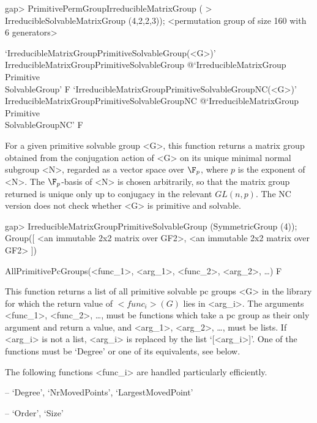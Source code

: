 \beginexample
gap> PrimitivePermGroupIrreducibleMatrixGroup (
>       IrreducibleSolvableMatrixGroup (4,2,2,3));
<permutation group of size 160 with 6 generators>
\endexample

\>`IrreducibleMatrixGroupPrimitiveSolvableGroup(<G>)'%
{IrreducibleMatrixGroupPrimitiveSolvableGroup}%
@{`IrreducibleMatrixGroup\\Primitive\\SolvableGroup'} F
\>`IrreducibleMatrixGroupPrimitiveSolvableGroupNC(<G>)'%
{IrreducibleMatrixGroupPrimitiveSolvableGroupNC}%
@{`IrreducibleMatrixGroup\\Primitive\\SolvableGroupNC'} F

For a given primitive solvable group <G>, this function returns a matrix group 
obtained from the conjugation
action of <G> on its unique minimal normal subgroup <N>, regarded as a vector 
space over $\F_p$, where $p$ is the exponent of <N>. 
The $\F_p$-basis of <N> is chosen arbitrarily, so that the matrix group returned 
is unique only up to conjugacy in the relevant $GL(n, p)$. The NC version does
not check whether <G> is primitive and solvable.

\beginexample
gap> IrreducibleMatrixGroupPrimitiveSolvableGroup (SymmetricGroup (4));
Group([ <an immutable 2x2 matrix over GF2>, 
  <an immutable 2x2 matrix over GF2> ])
\endexample


\>AllPrimitivePcGroups(<func_1>, <arg_1>, <func_2>, <arg_2>, \dots) F

This function returns a list of all primitive solvable pc
groups <G> in the  {\IRREDSOL} library for which the return value of $<func_i>(G)$ lies
in <arg_i>.  The arguments <func_1>, <func_2>, \dots,
must be {\GAP} functions which take a pc group as their only argument and return a
value, and <arg_1>, <arg_2>,
\dots,  must be lists. If <arg_i> is not a list, <arg_i> is replaced by the list
`[<arg_i>]'. One of the functions must be `Degree' or one of its
equivalents, see below.

The following functions <func_i> are handled particularly efficiently.

\beginlist
\item{--} `Degree', `NrMovedPoints', `LargestMovedPoint'
\item{--} `Order', `Size'
\endlist

